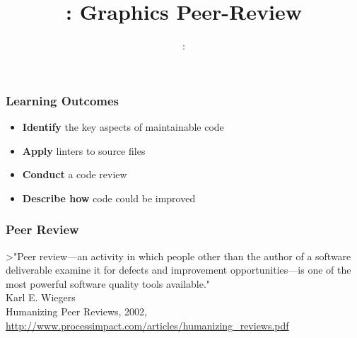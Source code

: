 \usepackage{../../beamerthemeFalmouthGamesAcademy}
\usepackage{multimedia}
\graphicspath{ {../../} }

\usepackage{textcomp}


\usepackage[normalem]{ulem}
\usepackage{wasysym}

\usepackage{pdfpages}

\usetikzlibrary{arrows,automata}





\title{\sessionnumber: Graphics Peer-Review}
\subtitle{\modulecode: \moduletitle}

\frame{\titlepage} 

\begin{frame}
	\frametitle{Learning Outcomes}
	\begin{itemize}
		\item \textbf{Identify} the key aspects of maintainable code
		\item \textbf{Apply} linters to source files
		\item\textbf{Conduct} a code review
		\item\textbf{Describe how} code could be improved
	\end{itemize}
\end{frame}

\begin{frame}
	\frametitle{Peer Review}
	>"Peer review—an activity in which people other than the author of a software deliverable
examine it for defects and improvement opportunities—is one of the most powerful software
quality tools available."  \\
Karl E. Wiegers \\
Humanizing Peer Reviews, 2002, \url{http://www.processimpact.com/articles/humanizing_reviews.pdf}
\end{frame}

